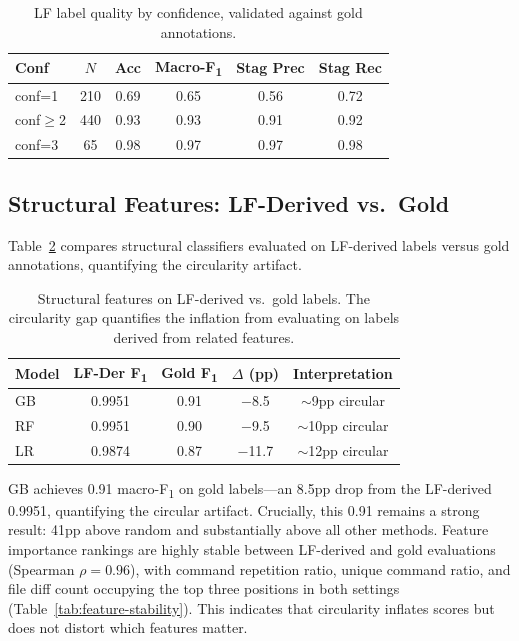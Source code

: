 \documentclass[11pt,a4paper]{article}
\newcommand{\fone}{F\textsubscript{1}}
\begin{document}
\begin{table}[t]
\centering
\small
\begin{tabular}{lccccc}
\toprule
Conf & $N$ & Acc & Macro-\fone{} & Stag Prec & Stag Rec \\
\midrule
conf=1 & 210 & 0.69 & 0.65 & 0.56 & 0.72 \\
conf$\geq$2 & 440 & 0.93 & 0.93 & 0.91 & 0.92 \\
conf=3 & 65 & 0.98 & 0.97 & 0.97 & 0.98 \\
\bottomrule
\end{tabular}
\caption{LF label quality by confidence, validated against gold annotations.}
\label{tab:lf-quality-gold}
\end{table}


\subsection{Structural Features: LF-Derived vs.\ Gold}
\label{sec:structural-gold}

Table~\ref{tab:structural-gold} compares structural classifiers evaluated on LF-derived labels versus gold annotations, quantifying the circularity artifact.

\begin{table}[t]
\centering
\small
\begin{tabular}{lcccc}
\toprule
Model & LF-Der \fone{} & Gold \fone{} & $\Delta$ (pp) & Interpretation \\
\midrule
GB & 0.9951 & 0.91 & $-$8.5 & $\sim$9pp circular \\
RF & 0.9951 & 0.90 & $-$9.5 & $\sim$10pp circular \\
LR & 0.9874 & 0.87 & $-$11.7 & $\sim$12pp circular \\
\bottomrule
\end{tabular}
\caption{Structural features on LF-derived vs.\ gold labels. The circularity gap quantifies the inflation from evaluating on labels derived from related features.}
\label{tab:structural-gold}
\end{table}

GB achieves 0.91 macro-\fone{} on gold labels---an 8.5pp drop from the LF-derived 0.9951, quantifying the circular artifact. Crucially, this 0.91 remains a strong result: 41pp above random and substantially above all other methods. Feature importance rankings are highly stable between LF-derived and gold evaluations (Spearman $\rho{=}0.96$), with command repetition ratio, unique command ratio, and file diff count occupying the top three positions in both settings (Table~\ref{tab:feature-stability}). This indicates that circularity inflates scores but does not distort which features matter.
\end{document}
